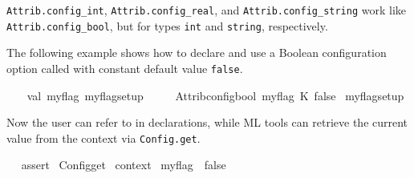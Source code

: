 \begin{isabellebody}
\begin{isamarkuptext}
\begin{description}
  \item \verb|Attrib.config_int|, \verb|Attrib.config_real|, and \verb|Attrib.config_string| work like \verb|Attrib.config_bool|, but for
  types \verb|int| and \verb|string|, respectively.

  \end{description}%
\end{isamarkuptext}%
\isamarkuptrue%
%
\endisatagmlref
{\isafoldmlref}%
%
\isadelimmlref
%
\endisadelimmlref
%
\isadelimmlex
%
\endisadelimmlex
%
\isatagmlex
%
\begin{isamarkuptext}%
The following example shows how to declare and use a
  Boolean configuration option called  with constant
  default value \verb|false|.%
\end{isamarkuptext}%
\isamarkuptrue%
%
\endisatagmlex
{\isafoldmlex}%
%
\isadelimmlex
%
\endisadelimmlex
%
\isadelimML
%
\endisadelimML
%
\isatagML
{}\isamarkupfalse%
\ {}\isanewline
\ \ val\ {}my{}flag{}\ my{}flag{}setup{}\ {}\isanewline
\ \ \ \ Attrib{}config{}bool\ {}my{}flag{}\ {}K\ false{}\isanewline
{}\isanewline
{}\isamarkupfalse%
\ my{}flag{}setup%
\endisatagML
{\isafoldML}%
%
\isadelimML
%
\endisadelimML
%
\begin{isamarkuptext}%
Now the user can refer to \hyperlink{attribute.my-flag}{\mbox{}} in
  declarations, while ML tools can retrieve the current value from the
  context via \verb|Config.get|.%
\end{isamarkuptext}%
\isamarkuptrue%
%
\isadelimML
%
\endisadelimML
%
\isatagML
{}\isamarkupfalse%
\ {}\ %
\isaantiq
assert{}%
\endisaantiq
\ {}Config{}get\ %
\isaantiq
context{}%
\endisaantiq
\ my{}flag\ {}\ false{}\ {}%

\end{isabellebody}

